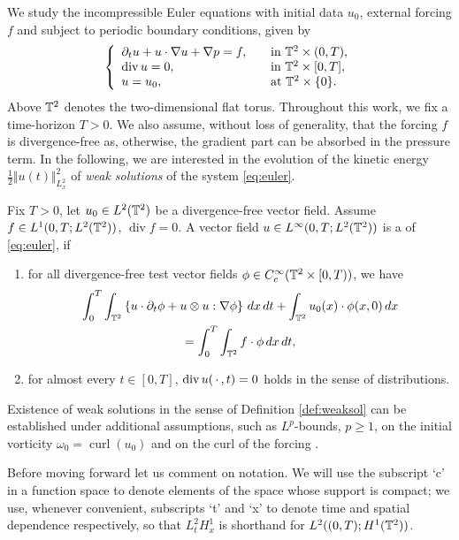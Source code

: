 \documentclass[reqno,12pt]{amsart}
\DeclareMathOperator{\dv}{div}
\DeclareMathOperator{\curl}{curl}
\begin{document}
We study the incompressible Euler equations with initial data $u_0$, external forcing $f$ and subject to periodic boundary conditions, given by
\begin{gather}
\label{eq:euler}
\left\{
\begin{array}{ll}
  \partial_t u + u\cdot \nabla u + \nabla p = f, \quad &\text{in } \T^2 \times (0,T), \\
  \dv  u = 0, &\text{in } \T^2 \times [0,T], \\
  u = u_0, & \text{at } \T^2 \times \{0\}.
\end{array}
\right.
\end{gather}
Above $\mathbb{T}^2$ denotes the two-dimensional flat torus. Throughout this work, we fix a time-horizon $T>0$. We also assume, without loss of generality, that the forcing $f$ is divergence-free as, otherwise, the gradient part can be absorbed in the pressure term. In the following, we are interested in the evolution of the kinetic energy $\frac12 \Vert u(t) \Vert_{L^2_x}^2$ of \emph{weak solutions} of the system \eqref{eq:euler}.

\begin{definition}
  \label{def:weaksol}
  Fix $T>0$, let $u_0 \in L^2 (\mathbb{T}^2)$ be a divergence-free vector field. Assume $f\in
  L^1 (0,T;L^2 (\mathbb{T}^2))$, $\dv f = 0$. A vector field $u\in L^\infty (0,T;L^2 (\mathbb{T}^2))$ is a  of \eqref{eq:euler}, if
    \begin{enumerate}
      \item for all divergence-free test vector fields $\phi\in C_c^\infty(\mathbb{T}^2 \times [0,T))$, we have
\begin{multline}
\int_0^T
\int_{\mathbb{T}^2} \left\{ u\cdot \partial_t \phi
+ u\otimes u : \nabla \phi \right\} \, dx \, dt
+ \int_{\mathbb{T}^2}  u_0(x) \cdot \phi(x,0) \, dx \\
= \int_0^T \int_{\mathbb{T}^2} f \cdot \phi \, dx \, dt,
\end{multline}
\item for almost every $t\in [0,T]$, $\dv  u(\slot,t) = 0$ holds in the sense of distributions.
  \end{enumerate}
\end{definition}

Existence of weak solutions in the sense of Definition \ref{def:weaksol} can be established under additional assumptions, such as $L^p$-bounds, $p\geq 1$, on the initial vorticity $\omega_0 = \curl(u_0)$ and on the curl of the forcing \cite{LN2022}.

Before moving forward let us comment on notation. We will use the subscript `c' in a function space to denote elements of the space whose support is compact; we use, whenever convenient, subscripts `t' and `x' to denote time and spatial dependence respectively, so that $L^2_tH^1_x$ is shorthand for $L^2((0,T);H^1(\mathbb{T}^2))$.
\end{document}

